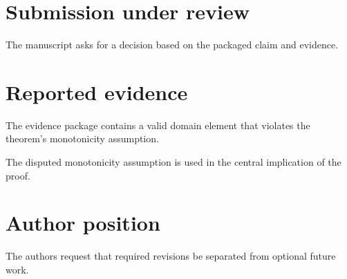 \documentclass{article}
\begin{document}
\section{Submission under review}
The manuscript asks for a decision based on the packaged claim and evidence.
\section{Reported evidence}
The evidence package contains a valid domain element that violates the theorem's monotonicity assumption.

The disputed monotonicity assumption is used in the central implication of the proof.
\section{Author position}
The authors request that required revisions be separated from optional future work.
\end{document}
